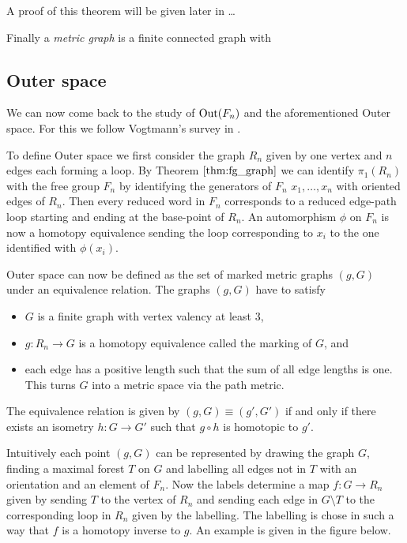 A proof of this theorem will be given later in \ldots

Finally a \emph{metric graph} is a finite connected graph with 

\subsection{Outer space}
We can now come back to the study of $\operatorname{Out}(F_{n})$ and the aforementioned Outer space. 
For this we follow Vogtmann's survey in \cite{vogtmann02}.

To define Outer space we first consider the graph $R_{n}$ given by one vertex and $n$ edges each forming a loop.
By Theorem $\ref{thm:fg_graph}$ we can identify $\pi_1(R_{n})$ with the free group $F_{n}$ by
identifying the generators of $F_{n}$ $x_1,\ldots,x_{n}$ with oriented edges of $R_{n}$.
Then every reduced word in $F_{n}$ corresponds to a reduced edge-path loop starting and ending at the base-point of $R_{n}$.
An automorphism $\phi$ on $F_{n}$ is now a homotopy equivalence sending the loop corresponding to $x_{i}$
to the one identified with $\phi(x_{i})$.

Outer space can now be defined as the set of marked metric graphs $(g,G)$ under an equivalence relation.
The graphs $(g,G)$ have to satisfy
\begin{itemize}
	\item $G$ is a finite graph with vertex valency at least $3$,
	\item $g: R_{n} \to G$ is a homotopy equivalence called the marking of $G$, and
	\item each edge has a positive length such that the sum of all
		edge lengths is one. This turns $G$ into a metric space via the path metric.
\end{itemize}
The equivalence relation is given by $(g,G) \equiv (g',G')$ if and only if 
there exists an isometry $h: G \to G'$ such that $g \circ h$ is homotopic to $g'$.

Intuitively each point $(g,G)$ can be represented by drawing the graph $G$,
finding a maximal forest $T$ on $G$ and labelling all edges not in $T$ with an orientation
and an element of $F_{n}$.
Now the labels determine a map $f: G \to R_{n}$ given by sending $T$ to the vertex of $R_{n}$ and sending
each edge in $G \setminus T$ to the corresponding loop in $R_{n}$ given by the labelling.
The labelling is chose in such a way that $f$ is a homotopy inverse to $g$.
An example is given in the figure below.

